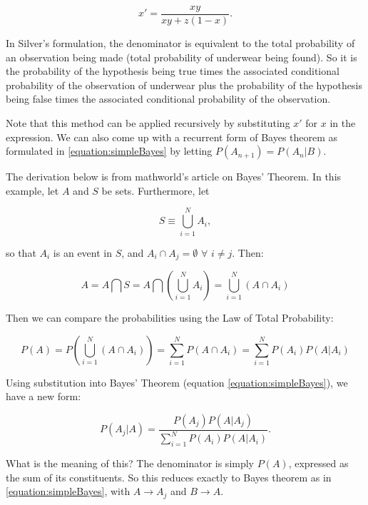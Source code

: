 \begin{equation}
x' = \frac{xy}{xy+z(1-x)}.
\end{equation}

In Silver's formulation, the denominator is equivalent to the total probability of an observation being made (total probability of underwear being found). So it is the probability of the hypothesis being true times the associated conditional probability of the observation of underwear plus the probability of the hypothesis being false times the associated conditional probability of the observation.

Note that this method can be applied recursively by substituting $x'$ for $x$ in the expression. We can also come up with a recurrent form of Bayes theorem as formulated in \ref{equation:simpleBayes} by letting $P(A_{n+1}) = P(A_{n}|B)$.

The derivation below is from mathworld's article on Bayes' Theorem. In this example, let $A$ and $S$ be sets. Furthermore, let 

\begin{equation}
S \equiv \bigcup_{i=1}^{N} A_{i},
\end{equation}

so that $A_{i}$ is an event in $S$, and $A_{i} \cap A_{j} = \emptyset$ $\forall$ $i \not= j$. Then:

\begin{equation}
A = A \bigcap S = A \bigcap ( \bigcup_{i=1}^{N} A_{i} ) = \bigcup_{i=1}^{N} (A \cap A_{i})
\end{equation}

Then we can compare the probabilities using the Law of Total Probability:

\begin{equation}
P(A) = P(\bigcup_{i=1}^{N} (A \cap A_{i}))=\sum_{i=1}^{N} P(A \cap A_{i}) = \sum_{i=1}^{N} P(A_{i}) P(A|A_{i})
\end{equation}

Using substitution into Bayes' Theorem (equation \ref{equation:simpleBayes}), we have a new form:

\begin{equation}
P(A_{j} | A) = \frac{P(A_{j}) P(A | A_{j})}{\sum_{i=1}^{N} P(A_{i}) P(A|A_{i})}.
\end{equation}

What is the meaning of this? The denominator is simply $P(A)$, expressed as the sum of its constituents. So this reduces exactly to Bayes theorem as in \ref{equation:simpleBayes}, with $A \rightarrow A_{j}$ and $B \rightarrow A$.

